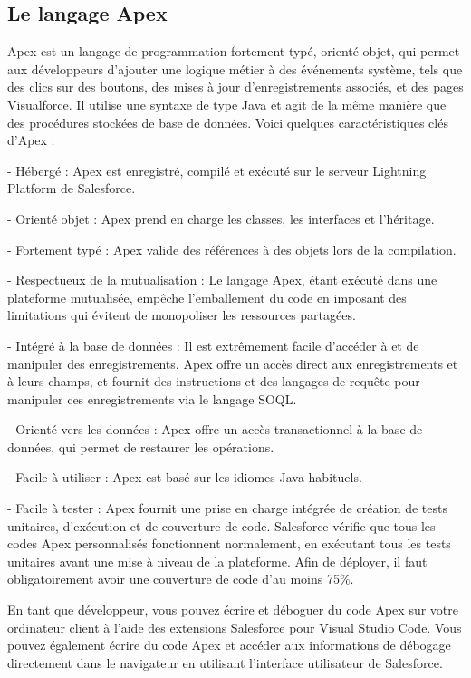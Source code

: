 \documentclass[12pt,oneside,noprintercorrection]{iut}
\begin{document}
\subsection{Le langage Apex}
Apex est un langage de programmation fortement typé, orienté objet, qui permet aux développeurs d'ajouter une logique métier à des événements système, tels que des clics sur des boutons, des mises à jour d'enregistrements associés, et des pages Visualforce. Il utilise une syntaxe de type Java et agit de la même manière que des procédures stockées de base de données. Voici quelques caractéristiques clés d'Apex :

- Hébergé : Apex est enregistré, compilé et exécuté sur le serveur Lightning Platform de Salesforce.

- Orienté objet : Apex prend en charge les classes, les interfaces et l'héritage.

- Fortement typé : Apex valide des références à des objets lors de la compilation.

- Respectueux de la mutualisation : Le langage Apex, étant exécuté dans une plateforme mutualisée, empêche l'emballement du code en imposant des limitations qui évitent de monopoliser les ressources partagées.

- Intégré à la base de données : Il est extrêmement facile d'accéder à et de manipuler des enregistrements. Apex offre un accès direct aux enregistrements et à leurs champs, et fournit des instructions et des langages de requête pour manipuler ces enregistrements via le langage SOQL.

- Orienté vers les données : Apex offre un accès transactionnel à la base de données, qui permet de restaurer les opérations.

- Facile à utiliser : Apex est basé sur les idiomes Java habituels.

- Facile à tester : Apex fournit une prise en charge intégrée de création de tests unitaires, d'exécution et de couverture de code. Salesforce vérifie que tous les codes Apex personnalisés fonctionnent normalement, en exécutant tous les tests unitaires avant une mise à niveau de la plateforme. Afin de déployer, il faut obligatoirement avoir une couverture de code d'au moins 75\%.

En tant que développeur, vous pouvez écrire et déboguer du code Apex sur votre ordinateur client à l’aide des extensions Salesforce pour Visual Studio Code. Vous pouvez également écrire du code Apex et accéder aux informations de débogage directement dans le navigateur en utilisant l’interface utilisateur de Salesforce.
\end{document}
